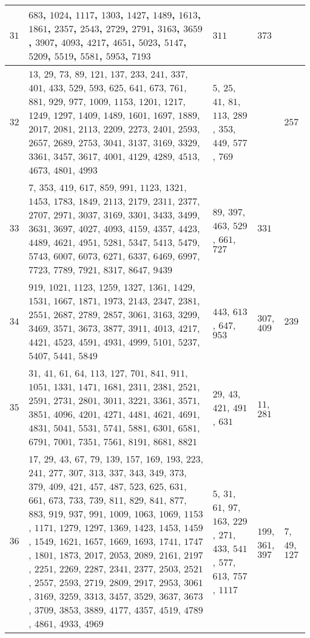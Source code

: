 \documentclass[11pt,reqno]{amsart}
\begin{document}
\begin{longtable}{ | p{0.5cm} | p{9cm} | p{2.5cm} | p{2.1cm} | p{2.1cm} | }
\hline
$31$ & $683$, $1024$, $1117$, $1303$, $1427$, $1489$, $1613$, $1861$, $2357$, $2543$, $2729$, $2791$, $3163$, $3659$, $3907$, $4093$, $4217$, $4651$, $5023$, $5147$, $5209$, $5519$, $5581$, $5953$, $7193$ & $311$ & $373$ & \ \ \\
\hline
$32$ & $13$, $29$, $73$, $89$, $121$, $137$, $233$, $241$, $337$, $401$, $433$, $529$, $593$, $625$, $641$, $673$, $761$, $881$, $929$, $977$, $1009$, $1153$, $1201$, $1217$, $1249$, $1297$, $1409$, $1489$, $1601$, $1697$, $1889$, $2017$, $2081$, $2113$, $2209$, $2273$, $2401$, $2593$, $2657$, $2689$, $2753$, $3041$, $3137$, $3169$, $3329$, $3361$, $3457$, $3617$, $4001$, $4129$, $4289$, $4513$, $4673$, $4801$, $4993$ & $5$, $25$, $41$, $81$, $113$, $289$, $353$, $449$, $577$, $769$ & \ \ & $257$ \\
\hline
$33$ & $7$, $353$, $419$, $617$, $859$, $991$, $1123$, $1321$, $1453$, $1783$, $1849$, $2113$, $2179$, $2311$, $2377$, $2707$, $2971$, $3037$, $3169$, $3301$, $3433$, $3499$, $3631$, $3697$, $4027$, $4093$, $4159$, $4357$, $4423$, $4489$, $4621$, $4951$, $5281$, $5347$, $5413$, $5479$, $5743$, $6007$, $6073$, $6271$, $6337$, $6469$, $6997$, $7723$, $7789$, $7921$, $8317$, $8647$, $9439$ & $89$, $397$, $463$, $529$, $661$, $727$ & $331$ & \ \ \\
\hline
$34$ & $919$, $1021$, $1123$, $1259$, $1327$, $1361$, $1429$, $1531$, $1667$, $1871$, $1973$, $2143$, $2347$, $2381$, $2551$, $2687$, $2789$, $2857$, $3061$, $3163$, $3299$, $3469$, $3571$, $3673$, $3877$, $3911$, $4013$, $4217$, $4421$, $4523$, $4591$, $4931$, $4999$, $5101$, $5237$, $5407$, $5441$, $5849$ & $443$, $613$, $647$, $953$ & $307$, $409$ & $239$ \\
\hline
$35$ & $31$, $41$, $61$, $64$, $113$, $127$, $701$, $841$, $911$, $1051$, $1331$, $1471$, $1681$, $2311$, $2381$, $2521$, $2591$, $2731$, $2801$, $3011$, $3221$, $3361$, $3571$, $3851$, $4096$, $4201$, $4271$, $4481$, $4621$, $4691$, $4831$, $5041$, $5531$, $5741$, $5881$, $6301$, $6581$, $6791$, $7001$, $7351$, $7561$, $8191$, $8681$, $8821$ & $29$, $43$, $421$, $491$, $631$ & $11$, $281$ & \ \ \\
\hline
$36$ & $17$, $29$, $43$, $67$, $79$, $139$, $157$, $169$, $193$, $223$, $241$, $277$, $307$, $313$, $337$, $343$, $349$, $373$, $379$, $409$, $421$, $457$, $487$, $523$, $625$, $631$, $661$, $673$, $733$, $739$, $811$, $829$, $841$, $877$, $883$, $919$, $937$, $991$, $1009$, $1063$, $1069$, $1153$, $1171$, $1279$, $1297$, $1369$, $1423$, $1453$, $1459$, $1549$, $1621$, $1657$, $1669$, $1693$, $1741$, $1747$, $1801$, $1873$, $2017$, $2053$, $2089$, $2161$, $2197$, $2251$, $2269$, $2287$, $2341$, $2377$, $2503$, $2521$, $2557$, $2593$, $2719$, $2809$, $2917$, $2953$, $3061$, $3169$, $3259$, $3313$, $3457$, $3529$, $3637$, $3673$, $3709$, $3853$, $3889$, $4177$, $4357$, $4519$, $4789$, $4861$, $4933$, $4969$ & $5$, $31$, $61$, $97$, $163$, $229$, $271$, $433$, $541$, $577$, $613$, $757$, $1117$ & $199$, $361$, $397$ & $7$, $49$, $127$ \\

\end{longtable}
\end{document}
